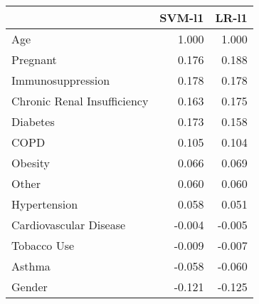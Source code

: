 \begin{tabular}{lrr}
\toprule
{} &  SVM-l1 &  LR-l1 \\
\midrule
Age                         &   1.000 &  1.000 \\
Pregnant                    &   0.176 &  0.188 \\
Immunosuppression           &   0.178 &  0.178 \\
Chronic Renal Insufficiency &   0.163 &  0.175 \\
Diabetes                    &   0.173 &  0.158 \\
COPD                        &   0.105 &  0.104 \\
Obesity                     &   0.066 &  0.069 \\
Other                       &   0.060 &  0.060 \\
Hypertension                &   0.058 &  0.051 \\
Cardiovascular Disease      &  -0.004 & -0.005 \\
Tobacco Use                 &  -0.009 & -0.007 \\
Asthma                      &  -0.058 & -0.060 \\
Gender                      &  -0.121 & -0.125 \\
\bottomrule
\end{tabular}
